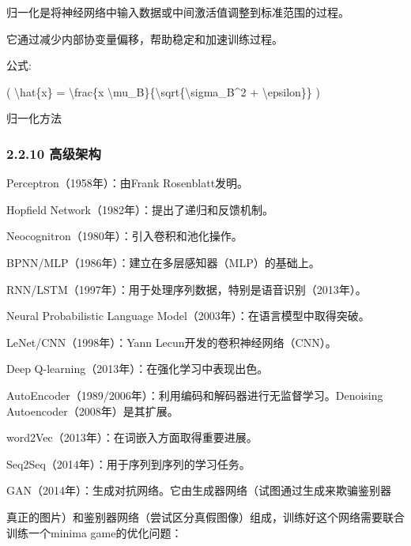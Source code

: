 归一化是将神经网络中输入数据或中间激活值调整到标准范围的过程。

它通过减少内部协变量偏移，帮助稳定和加速训练过程。

公式:

( \textbackslash hat\{x\} = \textbackslash frac\{x
\textbackslash mu\_B\}\{\textbackslash sqrt\{\textbackslash sigma\_B\^{}2
+ \textbackslash epsilon\}\} )


归一化方法


\subsubsection{\texorpdfstring{\textbf{2.2.10}
\textbf{高级架构}}{2.2.10 高级架构}}\label{2210-ux9ad8ux7ea7ux67b6ux6784}

Perceptron（1958年）：由Frank Rosenblatt发明。

Hopfield Network（1982年）：提出了递归和反馈机制。

Neocognitron（1980年）：引入卷积和池化操作。

BPNN/MLP（1986年）：建立在多层感知器（MLP）的基础上。

RNN/LSTM（1997年）：用于处理序列数据，特别是语音识别（2013年）。

Neural Probabilistic Language Model（2003年）：在语言模型中取得突破。

LeNet/CNN（1998年）：Yann Lecun开发的卷积神经网络（CNN）。

Deep Q-learning（2013年）：在强化学习中表现出色。

AutoEncoder（1989/2006年）：利用编码和解码器进行无监督学习。Denoising
Autoencoder（2008年）是其扩展。

word2Vec（2013年）：在词嵌入方面取得重要进展。

Seq2Seq（2014年）：用于序列到序列的学习任务。

GAN（2014年）：生成对抗网络。它由生成器网络（试图通过生成来欺骗鉴别器

真正的图片）和鉴别器网络（尝试区分真假图像）组成，训练好这个网络需要联合训练一个minima
game的优化问题：


